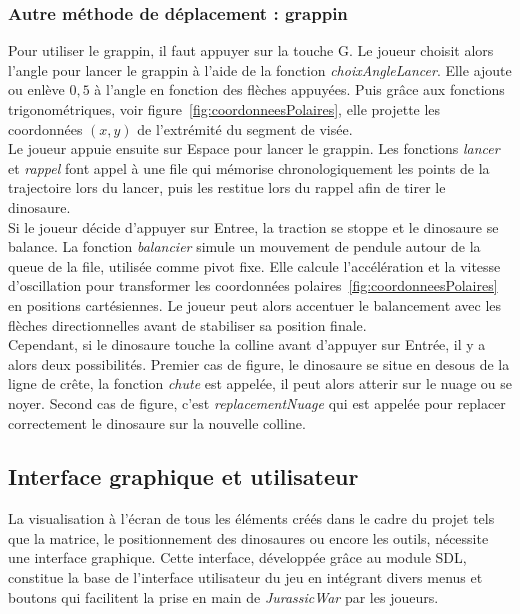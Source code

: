\documentclass[11pt,a4paper]{article}
\begin{document}
\subsubsection{Autre méthode de déplacement : grappin}
Pour utiliser le grappin, il faut appuyer sur la touche G. Le joueur choisit alors l'angle pour lancer le grappin à l'aide de la fonction \textit{\mbox{choixAngleLancer}}. Elle ajoute ou enlève $0,5$ à l'angle en fonction des flèches appuyées. Puis grâce aux fonctions trigonométriques, voir figure~\ref{fig:coordonneesPolaires}, elle projette les coordonnées $(x,y)$ de l'extrémité du segment de visée. \\
Le joueur appuie ensuite sur Espace pour lancer le grappin. Les fonctions \textit{\mbox{lancer}} et \textit{\mbox{rappel}} font appel à une \gls{file} qui mémorise chronologiquement les points de la trajectoire lors du lancer, puis les restitue lors du rappel afin de tirer le dinosaure. \\
Si le joueur décide d'appuyer sur Entree, la traction se stoppe et le dinosaure se balance. La fonction \textit{\mbox{balancier}} simule un mouvement de pendule autour de la queue de la file, utilisée comme pivot fixe. Elle calcule l'accélération et la vitesse d'oscillation pour transformer les coordonnées polaires~\ref{fig:coordonneesPolaires} en positions cartésiennes. Le joueur peut alors accentuer le balancement avec les flèches directionnelles avant de stabiliser sa position finale.\\ 
Cependant, si le dinosaure touche la colline avant d'appuyer sur Entrée, il y a alors deux possibilités. Premier cas de figure, le dinosaure se situe en desous de la ligne de crête, la fonction \textit{\mbox{chute}} est appelée, il peut alors atterir sur le nuage ou se noyer. Second cas de figure,  c'est \textit{\mbox{replacementNuage}} qui est appelée pour replacer correctement le dinosaure sur la nouvelle colline.
\subsection{Interface graphique et utilisateur}
La visualisation à l'écran de tous les éléments créés dans le cadre du projet tels que la matrice, le positionnement des dinosaures ou encore les outils, nécessite une interface graphique. Cette interface, développée grâce au module \gls{SDL}, constitue la base de l'interface utilisateur du jeu en intégrant divers menus et boutons qui facilitent la prise en main de \textit{\mbox{JurassicWar}} par les joueurs.  
\end{document}

